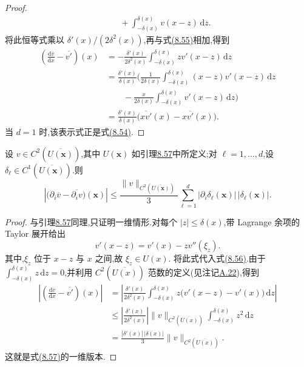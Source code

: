 \begin{proof}
\[\begin{aligned}
 &\quad+\int_{-\delta(x)}^{\delta(x)}v(x-z)\,\mathrm{d}z.
\end{aligned}
\]
将此恒等式乘以 $\delta'(x)/(2\delta^2(x))$,再与式\hyperref[eq:box-filter-commutation-derivative]{(8.55)}相加,得到
\begin{equation}\label{eq:box-filter-commutation-integral}
\begin{aligned}
 \left(\frac{\mathrm{d}\overline{v}}{\mathrm{d}x}
       -\overline{v'}\right)(x)
 &=-\frac{\delta'(x)}{2\delta^2(x)}
    \int_{-\delta(x)}^{\delta(x)}zv'(x-z)\,\mathrm{d}z\\
 &=\frac{\delta'(x)}{\delta(x)}\Biggl(
      \frac{1}{2\delta(x)}
        \int_{-\delta(x)}^{\delta(x)}(x-z)v'(x-z)\,\mathrm{d}z\\
 &\qquad
      -\frac{x}{2\delta(x)}
        \int_{-\delta(x)}^{\delta(x)}v'(x-z)\,\mathrm{d}z
    \Biggr)\\
 &=\frac{\delta'(x)}{\delta(x)}
    \bigl(\overline{xv'}(x)-x\overline{v'}(x)\bigr).
\end{aligned}
\end{equation}
当 $d=1$ 时,该表示式正是式\hyperref[eq:box-filter-commutation-representation]{(8.54)}.
\end{proof}

\begin{theorem}[交换误差的逐点误差估计]
\label{thm:box-filter-commutation-pointwise}
设 $v\in C^2(\overline{U(\bm{x})})$,其中 $U(\bm{x})$ 如引理\hyperref[lem:box-filter-commutation-representation]{8.57}中所定义;对 $\ell=1,\ldots,d$,设 $\delta_\ell\in C^1(\overline{U(\bm{x})})$.则
\begin{equation}\label{eq:box-filter-commutation-pointwise}
 \left|\bigl(\partial_i\overline{v}-\overline{\partial_i v}\bigr)(\bm{x})\right|
  \le \frac{\|v\|_{C^2(\overline{U(\bm{x})})}}{3}
       \sum_{\ell=1}^d
        |\partial_i\delta_\ell(\bm{x})|\,|\delta_\ell(\bm{x})|.
\end{equation}
\end{theorem}
\begin{proof}
与引理\hyperref[lem:box-filter-commutation-representation]{8.57}同理,只证明一维情形.对每个 $|z|\le\delta(x)$,带 Lagrange 余项的 Taylor 展开给出
\[
 v'(x-z)=v'(x)-zv''(\xi_z).
\]
其中,$\xi_z$ 位于 $x-z$ 与 $x$ 之间,故 $\xi_z\in U(x)$.
将此式代入式\hyperref[eq:box-filter-commutation-integral]{(8.56)}.由于 $\int_{-\delta(x)}^{\delta(x)}z\,\mathrm{d}z=0$,并利用 $C^2(\overline{U(x)})$ 范数的定义(见注记\hyperref[note:appendix-a-22]{A.22}),得到
\[
\begin{aligned}
 \left|\left(\frac{\mathrm{d}\overline{v}}{\mathrm{d}x}
       -\overline{v'}\right)(x)\right|
 &=\left|\frac{\delta'(x)}{2\delta^2(x)}
    \int_{-\delta(x)}^{\delta(x)}
       z\bigl(v'(x-z)-v'(x)\bigr)\,\mathrm{d}z\right|\\
 &\le\left|\frac{\delta'(x)}{2\delta^2(x)}\right|
      \|v\|_{C^2(\overline{U(x)})}
      \int_{-\delta(x)}^{\delta(x)}z^2\,\mathrm{d}z\\
 &=\frac{|\delta'(x)|\,|\delta(x)|}{3}
      \|v\|_{C^2(\overline{U(x)})}.
\end{aligned}
\]
这就是式\hyperref[eq:box-filter-commutation-pointwise]{(8.57)}的一维版本.
\end{proof}

